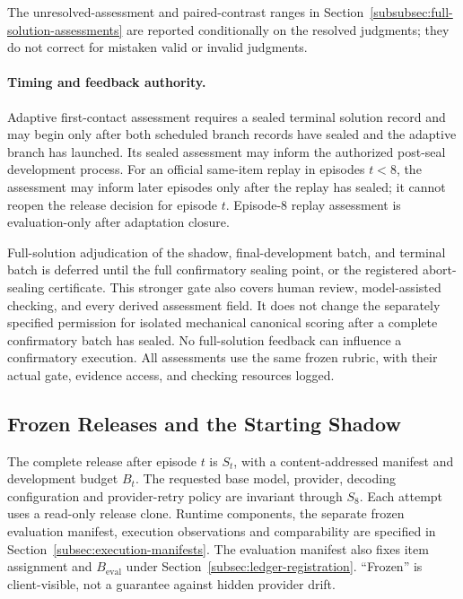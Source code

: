 \documentclass[10pt]{article} %
\providecommand{\1}{\mathbf{1}}  %
\theoremstyle{remark}
\theoremstyle{definition}
\begin{document}
The unresolved-assessment and paired-contrast ranges in
Section~\ref{subsubsec:full-solution-assessments} are reported
conditionally on the resolved judgments; they do not correct for
mistaken valid or invalid judgments.

\paragraph{Timing and feedback authority.}

Adaptive first-contact assessment requires a sealed terminal solution
record and may begin only after both scheduled branch records have
sealed and the adaptive branch has launched.
Its sealed assessment may inform the authorized post-seal development
process. For an official same-item replay in episodes $t<8$, the
assessment may inform later episodes only after the replay has sealed;
it cannot reopen the release decision for episode $t$.
Episode-8 replay assessment is evaluation-only after adaptation
closure.

Full-solution adjudication of the shadow, final-development batch,
and terminal batch is deferred until the full confirmatory sealing
point, or the registered abort-sealing certificate. This stronger
gate also covers human review, model-assisted checking, and every
derived assessment field. It does not change the separately specified
permission for isolated mechanical canonical scoring after a complete
confirmatory batch has sealed. No full-solution feedback can influence
a confirmatory execution. All assessments use the same frozen rubric,
with their actual gate, evidence access, and checking resources logged.

\subsection{Frozen Releases and the Starting Shadow}

\label{subsec:pilot-frozen-releases}

The complete release after episode $t$ is $S_t$, with a content-addressed
manifest and development budget $B_t$. The requested base model, provider,
decoding configuration and provider-retry policy are invariant through $S_8$.
Each attempt uses a read-only release clone. Runtime components, the separate
frozen evaluation manifest, execution observations and comparability are
specified in Section~\ref{subsec:execution-manifests}. The evaluation manifest
also fixes item assignment and $B_{\mathrm{eval}}$ under
Section~\ref{subsec:ledger-registration}. ``Frozen'' is client-visible,
not a guarantee against hidden provider drift.
\end{document}
